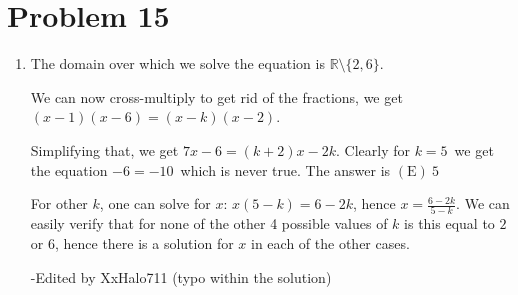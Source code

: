 \documentclass{article}%
\begin{document}
%
\section*{Problem 15}%
\label{sec:Problem15}%
\begin{enumerate}%
\item%
The domain over which we solve the equation is $\mathbb{R} \setminus \{2,6\}$.

We can now cross-multiply to get rid of the fractions, we get $(x-1)(x-6)=(x-k)(x-2)$.

Simplifying that, we get $7x-6 = (k+2)x - 2k$. Clearly for $k=5$ we get the equation $-6=-10$ which is never true. The answer is $\boxed{\mathrm{ (E)}\ 5}$

For other $k$, one can solve for $x$: $x(5-k) = 6-2k$, hence $x=\frac {6-2k}{5-k}$. We can easily verify that for none of the other 4 possible values of $k$ is this equal to $2$ or $6$, hence there is a solution for $x$ in each of the other cases.

-Edited by XxHalo711 (typo within the solution)

%
\end{enumerate}

%
\end{document}
